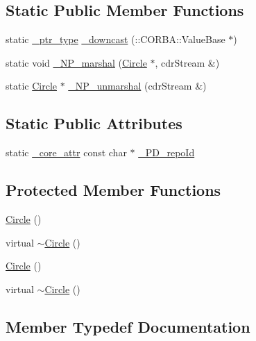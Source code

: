 \subsection*{Static Public Member Functions}
\begin{DoxyCompactItemize}
\item 
static \hyperlink{class_draw_a5164256572b3c4123ceecd1897c248dd}{\+\_\+ptr\+\_\+type} \hyperlink{class_circle_a264dbd97a8e3819388a008d722aab612}{\+\_\+downcast} (\+::C\+O\+R\+B\+A\+::\+Value\+Base $\ast$)
\item 
static void \hyperlink{class_circle_a6b682a01a8bf70dad668ec3f1fc1c5ef}{\+\_\+\+N\+P\+\_\+marshal} (\hyperlink{class_circle}{Circle} $\ast$, cdr\+Stream \&)
\item 
static \hyperlink{class_circle}{Circle} $\ast$ \hyperlink{class_circle_ae8e42637a424b531bcba7cb48fc398ef}{\+\_\+\+N\+P\+\_\+unmarshal} (cdr\+Stream \&)
\end{DoxyCompactItemize}
\subsection*{Static Public Attributes}
\begin{DoxyCompactItemize}
\item 
static \hyperlink{_petit_prince_8hpp_a5f7bf7cddb608c2aad7c95f55f8a33c5}{\+\_\+core\+\_\+attr} const char $\ast$ \hyperlink{class_circle_a3cc85c810268073e3c3f0519aa3b12a0}{\+\_\+\+P\+D\+\_\+repo\+Id}
\end{DoxyCompactItemize}
\subsection*{Protected Member Functions}
\begin{DoxyCompactItemize}
\item 
\hyperlink{class_circle_ad1ecfcfc7bf34529c6a6d6c448bf70fe}{Circle} ()
\item 
virtual \hyperlink{class_circle_ad02555ca63f3574193b958c49f81d178}{$\sim$\+Circle} ()
\item 
\hyperlink{class_circle_ad1ecfcfc7bf34529c6a6d6c448bf70fe}{Circle} ()
\item 
virtual \hyperlink{class_circle_ad02555ca63f3574193b958c49f81d178}{$\sim$\+Circle} ()
\end{DoxyCompactItemize}


\subsection{Member Typedef Documentation}
